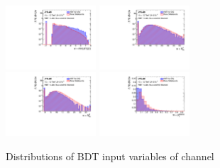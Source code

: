 \begin{figure}[htbp]
 \includegraphics[width=0.3\textwidth]{figures/VBF/BDT_input_mindRJ2_Ex4cen.pdf}
 \includegraphics[width=0.3\textwidth]{figures/VBF/BDT_input_QGTaggerJ14cen.pdf}\\
 \includegraphics[width=0.3\textwidth]{figures/VBF/BDT_input_QGTaggerJ24cen.pdf}
 \includegraphics[width=0.3\textwidth]{figures/VBF/BDT_input_pT_balance4cen.pdf}\\

\caption{Distributions of BDT input variables of \fourcentral channel}
  \label{fig:vbf-BDTInputs4cen}
\end{figure}

\clearpage

